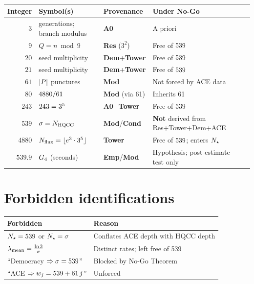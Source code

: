 {\begin{center}
\small
\begin{tabular}{@{}rlllp{}@{}}
\toprule
Integer & Symbol(s) & Provenance & Under No-Go \\
\midrule
\(3\) & generations; branch modulus & \textbf{A0} & A priori \\
\(9\) & \(Q=n\bmod 9\) & \textbf{Res} (\(3^2\)) & Free of \(539\) \\
\(20\) & seed multiplicity & \textbf{Dem}+\textbf{Tower} & Free of \(539\) \\
\(21\) & seed multiplicity & \textbf{Dem}+\textbf{Tower} & Free of \(539\) \\
\(61\) & \(|P|\) punctures & \textbf{Mod} & Not forced by ACE data \\
\(80\) & \(4880/61\) & \textbf{Mod} (via 61) & Inherits 61 \\
\(243\) & \(243=3^5\) & \textbf{A0}+\textbf{Tower} & Free of \(539\) \\
\(539\) & \(\sigma=N_{\mathrm{HQCC}}\) & \textbf{Mod}/\textbf{Cond} & \textbf{Not} derived from Res+Tower+Dem+ACE \\
\(4880\) & \(N_{\mathrm{flux}}=\lfloor e^3\cdot 3^5\rfloor\) & \textbf{Tower} & Free of \(539\); enters \(N_{\star}\) \\
\(539.9\) & \(G_{4}\) (seconds) & \textbf{Emp}/\textbf{Mod} & Hypothesis; post-estimate test only \\
\bottomrule
\end{tabular}
\end{center}

\section{Forbidden identifications}

\begin{center}
\begin{tabular}{@{}lp{}@{}}
\toprule
Forbidden & Reason \\
\midrule
\(N_{\star}=539\) or \(N_{\star}=\sigma\) & Conflates ACE depth with HQCC depth \\
\(\lambda_{\mathrm{mean}}=\frac{\ln 3}{\sigma}\) & Distinct rates; left free of 539 \\
``Democracy \(\Rightarrow\sigma=539\)'' & Blocked by No-Go Theorem \\
``ACE \(\Rightarrow w_j=539+61\, j\)'' & Unforced \\
\bottomrule
\end{tabular}
\end{center}

}

